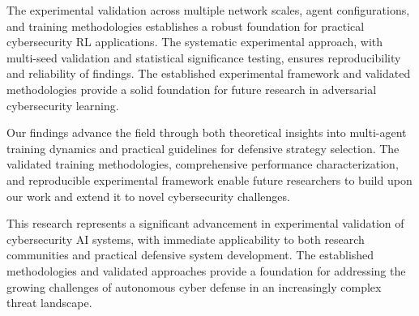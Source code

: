 \documentclass[11pt]{article}
\theoremstyle{definition}
\theoremstyle{plain}
\begin{document}
The experimental validation across multiple network scales, agent configurations, and training methodologies establishes a robust foundation for practical cybersecurity RL applications. The systematic experimental approach, with multi-seed validation and statistical significance testing, ensures reproducibility and reliability of findings. The established experimental framework and validated methodologies provide a solid foundation for future research in adversarial cybersecurity learning.

Our findings advance the field through both theoretical insights into multi-agent training dynamics and practical guidelines for defensive strategy selection. The validated training methodologies, comprehensive performance characterization, and reproducible experimental framework enable future researchers to build upon our work and extend it to novel cybersecurity challenges.

This research represents a significant advancement in experimental validation of cybersecurity AI systems, with immediate applicability to both research communities and practical defensive system development. The established methodologies and validated approaches provide a foundation for addressing the growing challenges of autonomous cyber defense in an increasingly complex threat landscape.



\end{document}

